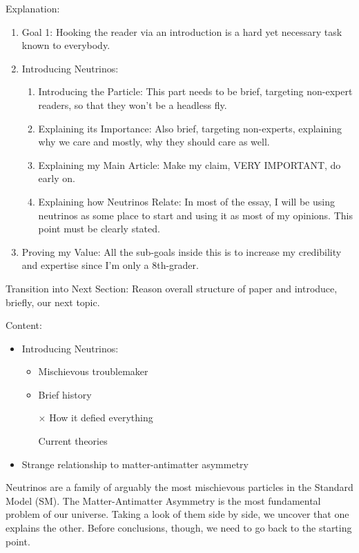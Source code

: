 \documentclass[a4paper,12pt]{article}
\begin{document}
Explanation:
\begin{enumerate}
	\item Goal 1: Hooking the reader via an introduction is a hard yet necessary task known to everybody.
	\item Introducing Neutrinos:
	\begin{enumerate}
		\item Introducing the Particle: This part needs to be brief, targeting non-expert readers, so that they won’t be a headless fly.
		\item Explaining its Importance: Also brief, targeting non-experts, explaining why we care and mostly, why they should care as well.
		\item Explaining my Main Article: Make my claim, VERY IMPORTANT, do early on.
		\item Explaining how Neutrinos Relate: In most of the essay, I will be using neutrinos as some place to start and using it as most of my opinions. This point must be clearly stated.
	\end{enumerate}
	\item Proving my Value: All the sub-goals inside this is to increase my credibility and expertise since I’m only a 8th-grader.
\end{enumerate}

Transition into Next Section: Reason overall structure of paper and introduce, briefly, our next topic.

Content:
\begin{itemize} %
	\item Introducing Neutrinos:
	\begin{itemize} 
		\item Mischievous troublemaker
		\item Brief history
		\item[$\times$] How it defied everything %
		\item[\checkmark] Current theories
	\end{itemize}
	\item Strange relationship to matter-antimatter asymmetry
\end{itemize}

Neutrinos are a family of arguably the most mischievous particles in the Standard Model (SM). The Matter-Antimatter Asymmetry is the most fundamental problem of our universe. Taking a look of them side by side, we uncover that one explains the other. Before conclusions, though, we need to go back to the starting point.
\end{document}
